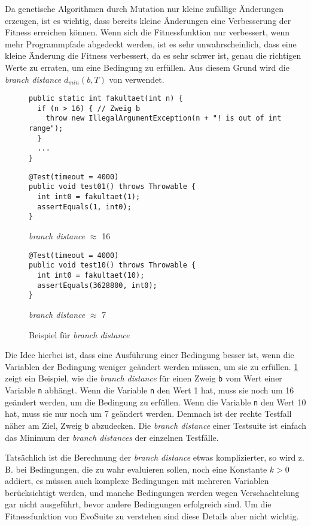 \documentclass[a4paper,11pt]{article}
\begin{document}
Da genetische Algorithmen durch Mutation nur kleine zufällige Änderungen erzeugen, ist es wichtig, dass bereits kleine Änderungen eine Verbesserung der Fitness erreichen können.
Wenn sich die Fitnessfunktion nur verbessert, wenn mehr Programmpfade abgedeckt werden, ist es sehr unwahrscheinlich, dass eine kleine Änderung die Fitness verbessert, da es sehr schwer ist, genau die richtigen Werte zu erraten, um eine Bedingung zu erfüllen.
Aus diesem Grund wird die \textit{branch distance} $d_{min}(b, T)$ von \citet{10.1109/32.57624} verwendet.

\begin{figure}[h]
	\begin{lstlisting}[basicstyle=\ttfamily\tiny]
public static int fakultaet(int n) {
  if (n > 16) { // Zweig b
    throw new IllegalArgumentException(n + "! is out of int range");
  }
  ...
}
	\end{lstlisting}
	\begin{multicols}{2}
		\begin{lstlisting}[basicstyle=\ttfamily\tiny]
@Test(timeout = 4000)
public void test01() throws Throwable {
  int int0 = fakultaet(1);
  assertEquals(1, int0);
}
		\end{lstlisting}
		\textit{branch distance} $\approx$ 16
		\columnbreak
		\begin{lstlisting}[basicstyle=\ttfamily\tiny]
@Test(timeout = 4000)
public void test10() throws Throwable {
  int int0 = fakultaet(10);
  assertEquals(3628800, int0);
}
		\end{lstlisting}
		\textit{branch distance} $\approx$ 7
	\end{multicols}
	\caption{Beispiel für \textit{branch distance}}
	\label{fig:branch_distance}
\end{figure}

Die Idee hierbei ist, dass eine Ausführung einer Bedingung besser ist, wenn die Variablen der Bedingung weniger geändert werden müssen, um sie zu erfüllen.
\cref{fig:branch_distance} zeigt ein Beispiel, wie die \textit{branch distance} für einen Zweig \texttt{b} vom Wert einer Variable \texttt{n} abhängt.
Wenn die Variable \texttt{n} den Wert 1 hat, muss sie noch um 16 geändert werden, um die Bedingung zu erfüllen.
Wenn die Variable \texttt{n} den Wert 10 hat, muss sie nur noch um 7 geändert werden.
Demnach ist der rechte Testfall näher am Ziel, Zweig \texttt{b} abzudecken.
Die \textit{branch distance} einer Testsuite ist einfach das Minimum der \textit{branch distances} der einzelnen Testfälle.

Tatsächlich ist die Berechnung der \textit{branch distance} etwas komplizierter, so wird z. B. bei Bedingungen, die zu wahr evaluieren sollen, noch eine Konstante $k > 0$ addiert, es müssen auch komplexe Bedingungen mit mehreren Variablen berücksichtigt werden, und manche Bedingungen werden wegen Verschachtelung gar nicht ausgeführt, bevor andere Bedingungen erfolgreich sind.
Um die Fitnessfunktion von EvoSuite zu verstehen sind diese Details aber nicht wichtig.
\end{document}
